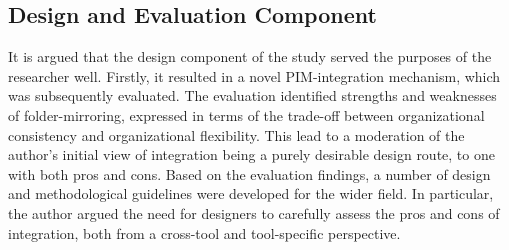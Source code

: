 




\subsection{Design and Evaluation Component}
\label{disc:methodological-discussion:design}

It is argued that the design component of the study served the purposes of the researcher well.  Firstly, it resulted in a novel PIM-integration mechanism, which was subsequently evaluated.  The evaluation identified strengths and weaknesses of folder-mirroring, expressed in terms of the trade-off between organizational consistency and organizational flexibility.  This lead to a moderation of the author's initial view of integration being a purely desirable design route, to one with both pros and cons.  Based on the evaluation findings, a number of design and methodological guidelines were developed for the wider field. In particular, the author argued the need for designers to carefully assess the pros and cons of integration, both from a cross-tool and tool-specific perspective. 

